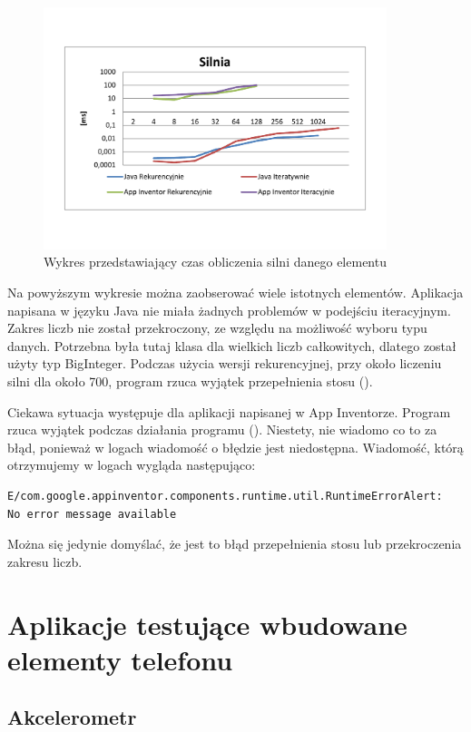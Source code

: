 \begin{figure}[H]
\centering\includegraphics[width=10cm]{figures/apps/factorialChart}
\caption{Wykres przedstawiający czas obliczenia silni danego elementu}
\end{figure}

Na powyższym wykresie można zaobserować wiele istotnych elementów. Aplikacja napisana w języku Java nie miała żadnych problemów w podejściu iteracyjnym. Zakres liczb nie został przekroczony, ze względu na możliwość wyboru typu danych. Potrzebna była tutaj klasa dla wielkich liczb całkowitych, dlatego został użyty typ BigInteger. Podczas użycia wersji rekurencyjnej, przy około liczeniu silni dla około 700, program rzuca wyjątek przepełnienia stosu ().

Ciekawa sytuacja występuje dla aplikacji napisanej w App Inventorze. Program rzuca wyjątek podczas działania programu (). Niestety, nie wiadomo co to za błąd, ponieważ w logach wiadomość o błędzie jest niedostępna. Wiadomość, którą otrzymujemy w logach wygląda następująco:

\begin{lstlisting}
E/com.google.appinventor.components.runtime.util.RuntimeErrorAlert:
No error message available
\end{lstlisting}

Można się jedynie domyślać, że jest to błąd przepełnienia stosu lub przekroczenia zakresu liczb.

\section{Aplikacje testujące wbudowane elementy telefonu}

\subsection{Akcelerometr}

